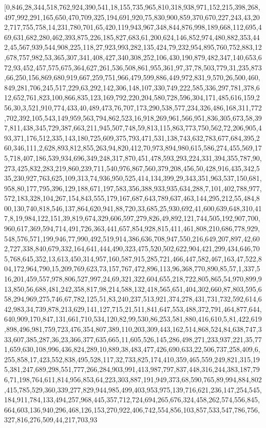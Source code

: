 \documentclass[a4paper,10pt]{article}
\begin{document}
[0,846,28,344,518,762,924,390,541,18,155,735,965,810,318,938,971,152,215,398,268,497,992,291,165,650,470,709,325,194,691,920,75,830,900,859,370,670,227,243,43,202,717,755,758,14,231,780,701,65,420,119,943,967,348,844,876,998,189,668,112,695,469,631,682,280,462,393,875,226,185,827,683,61,200,624,146,852,974,480,882,353,442,45,567,939,544,908,225,118,27,923,993,282,135,424,79,232,954,895,760,752,883,12,678,757,982,53,365,307,341,408,427,340,308,252,106,430,190,879,482,347,140,653,672,93,452,457,575,675,364,627,261,536,508,861,955,361,97,37,78,503,779,31,235,873,66,250,156,869,680,919,667,259,751,966,479,599,886,449,972,831,9,570,26,500,460,849,281,706,245,517,229,63,292,142,306,148,107,330,749,222,585,336,297,781,378,612,652,761,823,100,866,835,123,169,792,220,204,580,728,596,304,171,485,616,159,256,30,3,521,910,774,433,40,489,473,76,707,173,290,538,577,234,326,486,168,311,772,702,392,105,543,149,959,563,794,862,523,16,918,269,961,566,951,836,305,673,58,397,811,438,345,729,387,663,211,945,507,748,59,813,115,863,773,750,562,72,206,905,493,371,176,512,335,143,180,725,609,375,793,471,531,138,743,632,783,677,684,395,260,346,111,2,628,893,812,855,263,94,820,412,70,973,894,980,615,586,274,455,569,175,718,407,186,539,934,696,349,248,317,870,451,478,593,293,224,331,394,355,787,90,273,425,832,283,219,860,239,711,540,976,867,560,379,208,456,50,428,916,435,342,535,230,927,763,625,109,313,74,936,950,525,414,134,399,29,343,351,963,537,150,681,958,80,177,795,396,129,188,671,197,583,356,388,933,935,634,288,7,101,402,788,977,572,183,328,104,267,154,843,555,179,167,687,643,789,637,463,144,295,212,55,484,800,130,740,818,546,137,864,620,941,88,720,33,685,25,930,692,41,600,639,648,310,417,8,19,984,122,151,39,819,674,329,606,597,279,826,49,892,121,744,505,192,907,700,960,617,369,594,714,491,726,363,441,657,854,928,815,411,461,808,210,686,778,929,548,576,571,199,946,77,990,492,519,914,386,636,708,947,550,216,649,207,897,42,602,727,338,840,679,332,164,641,444,490,323,475,520,502,622,904,421,299,434,646,705,768,645,352,13,613,450,314,957,160,587,915,285,721,466,447,582,467,163,47,522,804,172,964,790,15,209,769,623,73,157,767,472,896,113,96,368,770,890,85,57,1,337,516,201,459,557,978,806,527,997,24,69,321,322,604,655,218,722,805,865,54,970,899,913,850,56,688,481,242,358,817,98,214,588,132,418,565,651,404,302,660,87,803,595,658,294,969,275,746,67,782,125,51,83,240,237,513,921,374,278,431,731,732,592,614,642,983,34,739,878,213,629,141,127,715,21,511,841,647,553,488,372,791,464,877,644,640,909,170,847,131,661,710,534,120,82,99,530,86,253,581,880,416,610,5,81,422,619,898,496,981,759,723,476,354,807,389,110,203,309,443,162,514,868,524,84,638,747,333,607,385,287,36,23,366,377,635,665,11,605,526,145,286,498,271,233,937,221,35,771,659,630,108,996,436,824,289,10,889,38,483,477,426,690,633,22,506,737,258,409,6,255,858,17,423,552,838,495,528,117,32,733,825,174,410,359,465,559,249,821,315,195,381,247,689,298,551,777,266,284,903,991,413,987,797,837,448,316,244,383,187,796,71,198,764,611,814,956,853,64,223,303,887,191,949,373,68,590,765,89,994,884,802,415,785,529,360,339,277,829,944,985,499,403,953,975,139,716,621,236,147,254,545,184,911,784,133,494,257,968,445,357,712,724,694,265,676,324,458,262,574,556,845,664,603,136,940,296,468,126,153,270,922,406,742,554,856,103,857,533,547,786,756,327,816,276,509,44,217,703,93
\end{document}
